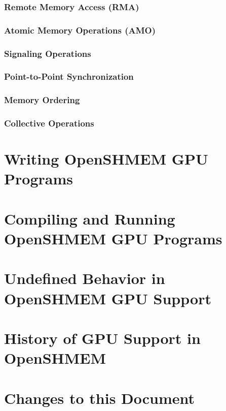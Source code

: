 \documentclass[10pt,oneside]{book}
\begin{document}
\subsubsection{Remote Memory Access (RMA)}\label{subsec:gc_rma}

\subsubsection{Atomic Memory Operations (AMO)}\label{subsec:gc_amo}

\subsubsection{Signaling Operations}\label{subsec:gc_signaling}

\subsubsection{Point-to-Point Synchronization}\label{subsec:gc_p2p}

\subsubsection{Memory Ordering}\label{subsec:gc_ordering}

\subsubsection{Collective Operations}\label{subsec:gc_collectives}

\section{Writing OpenSHMEM GPU Programs}\label{annex:writing}

\section{Compiling and Running OpenSHMEM GPU Programs}\label{annex:compiling}

\section{Undefined Behavior in OpenSHMEM GPU Support}\label{annex:undefined}

\section{History of GPU Support in OpenSHMEM}\label{annex:history}

\section{Changes to this Document}\label{annex:changes}


\printindex
\end{document}
